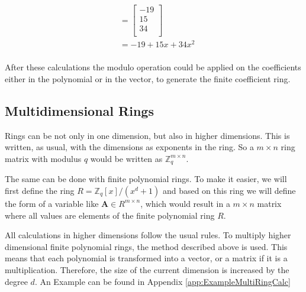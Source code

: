 \begin{align*}
{  }                                                                           \\
                 & = \begin{bmatrix}
                       -19 \\
                       15  \\
                       34  \\
                     \end{bmatrix}                                           \\
                 & = -19+15x+34x^2                                            \\                     
\end{align*}

After these calculations the modulo operation could be applied on the coefficients either in the polynomial or in the vector, to generate the finite coefficient ring.

\subsection*{Multidimensional Rings}

Rings can be not only in one dimension, but also in higher dimensions. This is written, as usual, with the dimensions as exponents in the ring. So a $m \times n$ ring matrix with modulus $q$ would be written as $\mathbb{Z}^{m\times n}_q$.

The same can be done with finite polynomial rings. To make it easier, we will first define the ring $R = \mathbb{Z}_q[x]/(x^d+1)$ and based on this ring we will define the form of a variable like $\textbf{A} \in R^{m\times n}$, which would result in a $m \times n$ matrix where all values are elements of the finite polynomial ring $R$.

All calculations in higher dimensions follow the usual rules. To multiply higher dimensional finite polynomial rings, the method described above is used. This means that each polynomial is transformed into a vector, or a matrix if it is a multiplication. Therefore, the size of the current dimension is increased by the degree $d$. An Example can be found in Appendix \ref{app:ExampleMultiRingCalc}